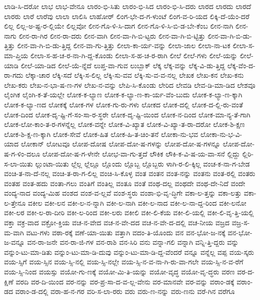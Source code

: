 {ಲಾಡಿ-ಸಿ-ದರೋ
ಲಾಭ
ಲಾಭ-ವೇನೂ
ಲಾರಂ-ಭಿ-ಸಿತು
ಲಾರಂ-ಭಿ-ಸಿದ
ಲಾರಂ-ಭಿ-ಸಿ-ದರು
ಲಾರದ
ಲಾರದು
ಲಾರದೆ
ಲಾರರು
ಲಾರೆ
ಲಾರೆವು
ಲಾಲಾ
ಲಾಲಿಸಿ
ಲಾಹೋರ್
ಲಿಂಗ-ಭೇ-ದ-ಗ-ಳುಂಟೆ
ಲಿಂಗ-ವ-ರಿ-ಯದ
ಲಿಕ್ಕಿ-ದೆ-ಯೆಂ-ದರೆ
ಲಿಲ್ಲ
ಲಿಲ್ಲ-ಅ-ಷ್ಟ-ರ-ಲ್ಲಿಯೇ
ಲಿಲ್ಲವೋ
ಲೀನ-ಗೊ-ಳಿ-ಸಿ-ದಾಗ
ಲೀನ-ಗೊ-ಳಿ-ಸಿ-ಬಿ-ಡ-ಬೇ-ಕೆಂಬ
ಲೀನ-ನಾಗಿ
ಲೀನ-ನಾಗು
ಲೀನ-ರಾ-ಗಿರ
ಲೀನ-ರಾ-ದರು
ಲೀನ-ವಾಗಿ
ಲೀನ-ವಾ-ಗಿ-ಬಿ-ಟ್ಟರು
ಲೀನ-ವಾ-ಗಿ-ಬಿ-ಟ್ಟಿತ್ತು
ಲೀನ-ವಾ-ಗಿ-ಬಿ-ಡು-ತ್ತಿತ್ತು
ಲೀನ-ವಾ-ಗಿ-ಬಿ-ಡು-ತ್ತಿದ್ದ
ಲೀನ-ವಾ-ಗು-ತ್ತಿತ್ತು
ಲೀಲಾ-ಕಾ-ರ್ಯ-ವನ್ನು
ಲೀಲಾ-ಜಾಲ
ಲೀಲಾ-ನಾ-ಟಕ
ಲೀಲಾ-ಸ-ಮಾ-ಪ್ತಿಯ
ಲೀಲಾ-ಸ-ಹ-ಚ-ರ-ನಾ-ಗಿ-ದ್ದ-ಕೊಂಡು
ಲೀಲಾ-ಸ-ಹ-ಚ-ರ-ರಾಗಿ
ಲೀಲೆ
ಲೀಲೆ-ಗಳು
ಲೀಲೆ-ಯನ್ನು
ಲೀಲೆ-ಯಾಡಿ
ಲೀಲೆ-ಯಾ-ಡಿದ
ಲೀಲೆ-ಯೆ-ನ್ನೆದೆ
ಲುಪ್ತ-ವಾ-ಗುವ
ಲುಬ್ಬಾಕ್
ಲೆಕ್ಕ
ಲೆಕ್ಕ-ವನ್ನು
ಲೆಕ್ಕ-ವಿ-ಡು-ತ್ತಿದ್ದ
ಲೆಕ್ಕ-ವೆಂ-ದ-ರಾ-ಗದು
ಲೆಕ್ಕಾ-ಚಾರ
ಲೆಕ್ಕಿ-ಸದೆ
ಲೆಕ್ಕಿ-ಸ-ಲಿಲ್ಲ
ಲೆಕ್ಕಿ-ಸು-ವವ
ಲೆಕ್ಕಿ-ಸು-ವ-ವ-ನಲ್ಲ
ಲೇಖಕ
ಲೇಖ-ಕನ
ಲೇಖ-ಕನು
ಲೇಖ-ಕರು
ಲೇಖ-ನ-ಭಾ-ಷ-ಣ-ಗಳ
ಲೇಖ-ನ-ವನ್ನು
ಲೇಪಿ-ಸಿ-ಕೊಂಡು
ಲೇರಿದ
ಲೇವಡಿ
ಲೇವ-ಡಿ-ಮಾ-ಡಿದ
ಲೇಶವೂ
ಲೈಂಗಿಕ
ಲೈಂಗಿ-ಕ-ತೆ-ಯಲ್ಲೇ
ಲೋಕ-ಕ-ಲ್ಯಾಣ
ಲೋಕ-ಕ-ಲ್ಯಾ-ಣ-ಕಾ-ರ್ಯ-ವೆಂ-ಬುದು
ಲೋಕ-ಕ-ಲ್ಯಾ-ಣ-ಕ್ಕಾಗಿ
ಲೋಕ-ಕ-ಲ್ಯಾ-ಣದ
ಲೋಕಕ್ಕೆ
ಲೋಕ-ಗಳ
ಲೋಕ-ಗು-ರು-ಗಳು
ಲೋಕದ
ಲೋಕ-ದಲ್ಲಿ
ಲೋಕ-ದ-ಲ್ಲಿ-ರು-ವಂತೆ
ಲೋಕ-ದಿಂದ
ಲೋಕ-ದೃ-ಷ್ಟಿ-ಗೆ-ಸಂ-ಸಾ-ರ-ಸ್ಥರೇ
ಲೋಕ-ದೃ-ಷ್ಟಿ-ಯಿಂದ
ಲೋಕ-ನ-ದಿಂದ
ಲೋಕ-ಮಾ-ನ್ಯ-ತೆ-ಗಾಗಿ
ಲೋಕ-ಲೋ-ಕಾಂ-ತ-ರ-ಗಳನ್ನೆಲ್ಲ
ಲೋಕ-ವನ್ನೇ
ಲೋಕ-ವಿ-ಖ್ಯಾತ
ಲೋಕ-ವಿ-ಖ್ಯಾ-ತ-ರಾ-ದರೋ
ಲೋಕ-ಶಿ-ಕ್ಷಣ
ಲೋಕ-ಶಿ-ಕ್ಷ-ಣ-ಕ್ಕಾಗಿ
ಲೋಕ-ಸೇವೆ
ಲೋಕ-ಹಿತ
ಲೋಕ-ಹಿ-ತ-ಚಿಂ-ತನೆ
ಲೋಕಾ-ನು-ಭವ
ಲೋಕಾ-ನು-ಭ-ವಿ-ಯಾದ
ಲೋಕಾನ್
ಲೋಟವೂ
ಲೋಪ-ದೋಷ
ಲೋಪ-ದೋ-ಷ-ಗಳನ್ನು
ಲೋಪ-ದೋ-ಷ-ಗಳನ್ನೂ
ಲೋಪ-ದೋ-ಷ-ಗ-ಳಿಂ-ದಲೂ
ಲೋಪ-ದೋ-ಷ-ಗ-ಳೇನೇ
ಲೋಭ-ವಾ-ಗು-ತ್ತದೆ
ಲೌಕಿಕ
ಲೌಕಿ-ಕ-ವಿ-ಷ-ಯ-ವಾ-ಸನೆ
ಲ್ಲಿದ್ದು
ಲ್ಲಿರಿ-ಸ-ಲಾ-ಯಿತು
ಲ್ಲುಂಟಾ-ಯಿತು
ಲ್ಲೆಲ್ಲ
ಲ್ಲೆಲ್ಲೂ
ಲ್ಲೊಂದು
ಲ್ಲೊಬ್ಬ
ಲ್ಲೊಬ್ಬರು
ಳಾಗಿ-ರ-ಲಿ-ಕ್ಕಿಲ್ಲ
ವಂಚ-ಕ-ನಾ-ಗ-ಬೇಡ
ವಂಚಿ-ತ-ನಾ-ದೆ-ನಲ್ಲ
ವಂಚಿ-ತ-ರಾ-ಗ-ಲಿಲ್ಲ
ವಂಚಿ-ಸಿ-ಕೊಳ್ಳ
ವಂತ
ವಂತನ
ವಂತ-ನನ್ನು
ವಂತನು
ವಂತ-ರಲ್ಲಿ
ವಂತರು
ವಂತಹ
ವಂತ-ಹದು
ವಂತಾ-ಗಲು
ವಂತಿಗೆ
ವಂತಿಲ್ಲ
ವಂತೂ
ವಂತೆ
ವಂಥ-ದಲ್ಲ
ವಂಥದೇ
ವಂಥ-ದೇ-ನಿದೆ
ವಂದೇ
ವಂದ್ಯ-ನಾದ
ವಂದ್ಯ-ಮಿಹ
ವಂಶದ
ವಂಶ-ವ-ಲ್ಲವೆ
ವಂಶ-ಸ್ಥರು
ವಂಶಾ-ಭಿ-ವೃ-ದ್ಧಿಗೇ
ವಕಾ-ಲ-ತ್ತನ್ನು
ವಕಾ-ಲತ್ತು
ವಕಾ-ಲ-ತ್ತೇನೂ
ವಕೀಲ
ವಕೀ-ಲನ
ವಕೀ-ಲ-ನ-ನ್ನಾಗಿ
ವಕೀ-ಲ-ನಾಗಿ
ವಕೀ-ಲ-ನಾದ
ವಕೀ-ಲ-ನಾ-ದ್ದ-ರಿಂದ
ವಕೀ-ಲನೋ
ವಕೀ-ಲರ
ವಕೀ-ಲ-ರಾ-ದೀರಿ
ವಕೀ-ಲ-ರಿಂದ
ವಕೀ-ಲರು
ವಕೀಲಿ
ವಕೀ-ಲಿ-ಕೆಯ
ವಕೀ-ಲಿ-ಯಲ್ಲಿ
ವಕೀ-ಲಿ-ವೃ-ತ್ತಿ-ಯಲ್ಲಿ
ವಕ್ತಾ
ವಕ್ರ-ವಾದ
ವಕ್ರೋ-ಕ್ತಿಯ
ವಚ-ನ-ವೇದ
ವಚ-ನ-ವೇ-ದದ
ವಚ-ನ-ವೇ-ದ-ದಲ್ಲಿ
ವಚ-ನೀಯ
ವಜ್ರದ
ವಜ್ರ-ಸ-ಮ-ವಾಗಿ
ವಟು-ಗಳು
ವಠಾ-ರಕ್ಕೆ
ವಣೆ-ಯಾ-ಯಿತು
ವತ್ತಾಗಿ
ವದಂ-ತಿ-ಯೊಂದು
ವನ
ವನ-ಭೋ-ಜ-ನಕ್ಕೆ
ವನ-ಭೋ-ಜ-ವನ್ನೂ
ವನ-ರಾ-ಜನೇ
ವನ-ರಾ-ಜಿ-ಗಳ
ವನ-ರಾಶಿ
ವನ-ಸಿರಿ
ವನು
ವನ್ನಾ-ಗಲಿ
ವನ್ನಾಗಿ
ವನ್ನಿ-ತ್ತಿ-ದ್ದರು
ವನ್ನು
ವನ್ನುಂ-ಟು-ಮಾ-ಡಿತು
ವನ್ನುಂ-ಟು-ಮಾ-ಡಿ-ದುವು
ವನ್ನುಂ-ಟು-ಮಾ-ಡಿ-ದ್ದ-ವೆಂದರೆ
ವನ್ನೂ
ವನ್ನೆಲ್ಲ
ವಪ್ಪ
ವಯ-ಸ್ಕರು
ವಯ-ಸ್ಸಿಗೆ
ವಯ-ಸ್ಸಿನ
ವಯ-ಸ್ಸಿ-ನಲ್ಲಿ
ವಯ-ಸ್ಸಿ-ನಲ್ಲೇ
ವಯ-ಸ್ಸಿ-ನ-ವ-ನಾ-ಗಿ-ರು-ವಾ-ಗಲೇ
ವಯ-ಸ್ಸಿ-ನ-ವ-ರೆಗೆ
ವಯ-ಸ್ಸಿ-ನಿಂದ
ವಯಸ್ಸು
ವಯೋ-ಗು-ಣಕ್ಕೆ
ವಯೋ-ಮಿ-ತಿ-ಯನ್ನು
ವಯೋ-ವೃದ್ಧ
ವಯೋ-ವೃ-ದ್ಧರು
ವರಣ
ವರ-ದ-ಕ್ಷಿಣೆ
ವರದಿ
ವರ-ದಿ-ಯಿಂದ
ವರ-ನನ್ನು
ವರ-ಪ್ರ-ಸಾ-ದ-ವ-ಲ್ಲ-ವೇನು
ವರ-ಮಾನವೇ
ವರ-ವನ್ನು
ವರಾಂ-ಡಕ್ಕೆ
ವರಾಂ-ಡದ
ವರಾಂ-ಡ-ದಲ್ಲಿ
ವರಾ-ಹ-ನ-ಗರ
ವರಿ-ಸ-ಲಾ-ರರು
ವರು
ವರು-ಣ-ನನ್ನು
ವರು-ಣನು
ವರೆ-ಗಿನ
ವರೆಗೂ
}
